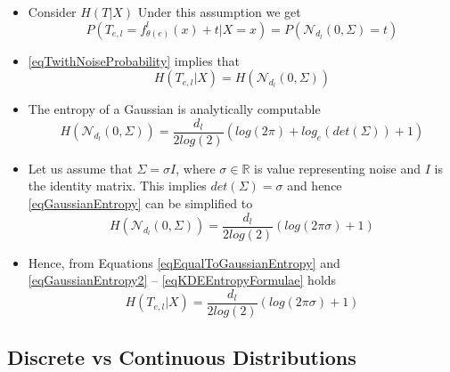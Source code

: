 \documentclass[dissertation.tex]{subfiles}
\begin{document}
\begin{itemize}
{    }
  \item{
      Consider $H(T|X)$ Under this assumption we get
      \begin{equation}
        P(T_{e,l} = f_{\theta(e)}^l(x) + t | X = x)
        =
        P(\mathcal{N}_{d_l}(0, \Sigma) = t)
        \label{eqTwithNoiseProbability}
      \end{equation}
    }
  \item{
      \autoref{eqTwithNoiseProbability} implies that
      \begin{equation}
        H(T_{e,l}|X)
        =
        H(\mathcal{N}_{d_l}(0, \Sigma))
        \label{eqEqualToGaussianEntropy}
      \end{equation}
    }
  \item{
      The entropy of a Gaussian is analytically computable
      \begin{equation}
        H(\mathcal{N}_{d_l}(0, \Sigma))
        =
        \frac{d_l}{2log(2)}(log(2\pi) + log_e({det(\Sigma)})+1)
        \label{eqGaussianEntropy}
      \end{equation}
    }
  \item{
      Let us assume that $\Sigma = \sigma I$, where $\sigma\in\mathbb{R}$ is
      value representing noise and $I$ is the identity matrix. This implies
      $det(\Sigma) = \sigma$ and hence \autoref{eqGaussianEntropy} can be
      simplified to
      \begin{equation}
        H(\mathcal{N}_{d_l}(0, \Sigma))
        =
        \frac{d_l}{2log(2)}(log(2\pi\sigma)+1)
        \label{eqGaussianEntropy2}
      \end{equation}
    }
  \item{
      Hence, from Equations \ref{eqEqualToGaussianEntropy} and
      \ref{eqGaussianEntropy2} -- \autoref{eqKDEEntropyFormulae} holds
      \begin{equation}
        H(T_{e,l}|X)
        =
        \frac{d_l}{2log(2)}(log(2\pi\sigma)+1)
        \label{eqKDEEntropyFormulae}
      \end{equation}
    }
\end{itemize}

\subsection{Discrete vs Continuous Distributions}
\end{document}
